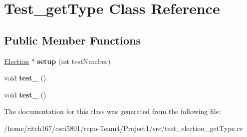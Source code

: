 \hypertarget{classTest__getType}{}\section{Test\+\_\+get\+Type Class Reference}
\label{classTest__getType}
\subsection*{Public Member Functions}
\begin{DoxyCompactItemize}
\item 
\mbox{\label{classTest__getType_afe500a15b2168742dafdc50c846e4b42}} 
\hyperlink{classElection}{Election} $\ast$ {\bfseries setup} (int test\+Number)
\item 
\mbox{\label{classTest__getType_af86bb8813f6c3214b4f9389eb222bc36}} 
void {\bfseries test\+\_} ()
\item 
\mbox{\label{classTest__getType_a317ac37c5d43720d64ce583af81e745d}} 
void {\bfseries test\+\_} ()
\end{DoxyCompactItemize}


The documentation for this class was generated from the following file\+:\begin{DoxyCompactItemize}
\item 
/home/ritch167/csci5801/repo-\/\+Team4/\+Project1/src/test\+\_\+election\+\_\+get\+Type.\+cc\end{DoxyCompactItemize}
